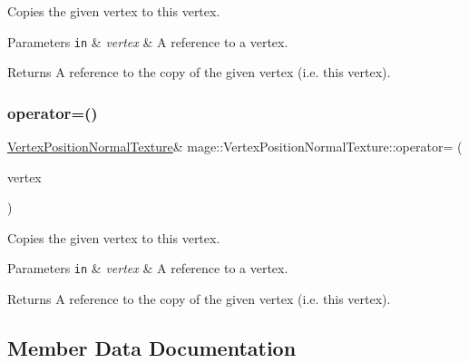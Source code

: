 Copies the given vertex to this vertex.


\begin{DoxyParams}[1]{Parameters}
\mbox{\tt in}  & {\em vertex} & A reference to a vertex. \\
\hline
\end{DoxyParams}
\begin{DoxyReturn}{Returns}
A reference to the copy of the given vertex (i.\+e. this vertex). 
\end{DoxyReturn}
\hypertarget{structmage_1_1_vertex_position_normal_texture_a5a3417f7b3ead1e96147d68e7bb1185f}{}\label{structmage_1_1_vertex_position_normal_texture_a5a3417f7b3ead1e96147d68e7bb1185f} 
\subsubsection{\texorpdfstring{operator=()}{operator=()}\hspace{0.1cm}{\footnotesize\ttfamily [2/2]}}
{\footnotesize\ttfamily \hyperlink{structmage_1_1_vertex_position_normal_texture}{Vertex\+Position\+Normal\+Texture}\& mage\+::\+Vertex\+Position\+Normal\+Texture\+::operator= (\begin{DoxyParamCaption}\item[{\hyperlink{structmage_1_1_vertex_position_normal_texture}{Vertex\+Position\+Normal\+Texture} \&\&}]{vertex }\end{DoxyParamCaption})\hspace{0.3cm}{\ttfamily [default]}}

Copies the given vertex to this vertex.


\begin{DoxyParams}[1]{Parameters}
\mbox{\tt in}  & {\em vertex} & A reference to a vertex. \\
\hline
\end{DoxyParams}
\begin{DoxyReturn}{Returns}
A reference to the copy of the given vertex (i.\+e. this vertex). 
\end{DoxyReturn}


\subsection{Member Data Documentation}
\hypertarget{structmage_1_1_vertex_position_normal_texture_a4e6f650ee5968c6dc873e8e41dae5395}{}\label{structmage_1_1_vertex_position_normal_texture_a4e6f650ee5968c6dc873e8e41dae5395} 

